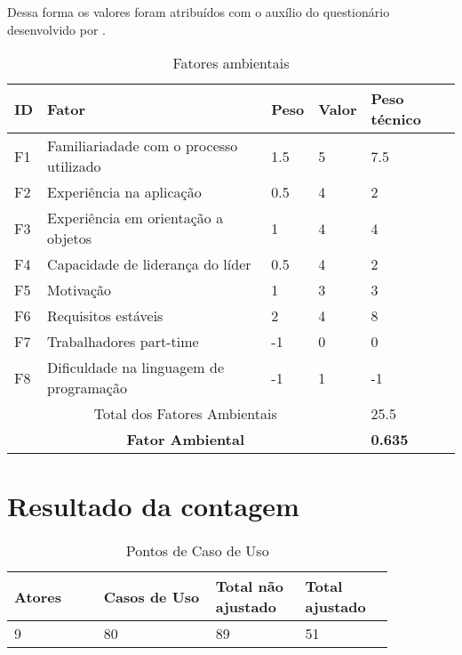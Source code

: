     Dessa forma os valores foram atribuídos com o auxílio do questionário desenvolvido por \cite{artigo_pcu}.
    \begin{table}[!h]
    \centering
    \caption{Fatores ambientais}
    \label{fatores_ambientais}
    \begin{tabular}{l|l|l|l|l}
    \hline
    ID  & Fator                                                          & Peso & Valor & Peso técnico\\
    \hline
    F1  & Familiariadade com o processo utilizado                        &  1.5  &  5  & 7.5  \\
    F2  & Experiência na aplicação                                       &  0.5  &  4  & 2  \\
    F3  & Experiência em orientação a objetos                            &   1   &  4  & 4  \\
    F4  & Capacidade de liderança do líder                               &  0.5  &  4  & 2  \\
    F5  & Motivação                                                      &   1   &  3  & 3  \\
    F6  & Requisitos estáveis                                            &   2   &  4  & 8  \\
    F7  & Trabalhadores part-time                                        &  -1   &  0  & 0  \\
    F8  & Dificuldade na linguagem de programação                        &  -1   &  1  & -1  \\
    \hline
    \multicolumn{4}{c}{Total dos Fatores Ambientais} & 25.5\\
    \hline
    \multicolumn{4}{c}{\textbf{Fator Ambiental}} & \textbf{0.635}\\
    \hline
    \end{tabular}
    \end{table}

\section{Resultado da contagem}

\begin{table*}[!h]
\centering
\caption{Pontos de Caso de Uso}
\label{Rotulo}
  \begin{tabular}{|p{0.20\linewidth}|p{0.25\linewidth}|p{0.20\linewidth}|p{0.20\linewidth}|}
  \hline
  \textbf{Atores} & \textbf{Casos de Uso} & \textbf{Total não ajustado} & \textbf{Total ajustado} \\ 
  \hline

  9 & 80 & 89 & 51\\
  \hline
  \end{tabular}
\end{table*}